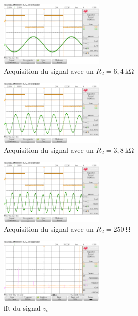 \documentclass[a4paper,twocolumn]{article}
\begin{document}
	\begin{figure}[H]
		\centering
		\includegraphics[width=0.45\textwidth]{figures/aq1.png}
		\caption{Acquisition du signal avec un $R_2 = 6{,}4\:\mathrm{k\Omega}$}
		\label{fig:aq1}
	\end{figure}

	\begin{figure}[H]
		\centering
		\includegraphics[width=0.45\textwidth]{figures/aq2.png}
		\caption{Acquisition du signal avec un $R_2 = 3{,}8\:\mathrm{k\Omega}$}
		\label{fig:aq2}
	\end{figure}

	\begin{figure}[H]
		\centering
		\includegraphics[width=0.45\textwidth]{figures/aq5.png}
		\caption{Acquisition du signal avec un $R_2 = 250\:\mathrm{\Omega}$}
		\label{fig:aq3}
	\end{figure}

	\begin{figure}[H]
		\centering
		\includegraphics[width=0.45\textwidth]{figures/fft2.png}
		\caption{{\sc fft}\/ du signal $v_\text{s}$}
		\label{fig:fft}
	\end{figure}

	\sign
\end{document}
